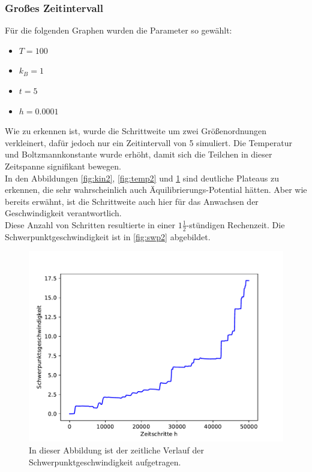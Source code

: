 \subsubsection{Großes Zeitintervall}
Für die folgenden Graphen wurden die Parameter so gewählt:
\begin{itemize}
    \item $T = 100$
    \item $k_B = 1$
    \item $t = 5$
    \item $h = 0.0001$
\end{itemize}
Wie zu erkennen ist, wurde die Schrittweite um zwei Größenordnungen verkleinert, dafür jedoch nur ein Zeitintervall von 5 simuliert.
Die Temperatur und Boltzmannkonstante wurde erhöht, damit sich die Teilchen in dieser Zeitspanne signifikant bewegen.\\
In den Abbildungen \ref{fig:kin2}, \ref{fig:temp2} und \ref{fig:swp2} sind deutliche Plateaus zu erkennen, die sehr wahrscheinlich auch Äquilibrierungs-Potential hätten.
Aber wie bereits erwähnt, ist die Schrittweite auch hier für das Anwachsen der Geschwindigkeit verantwortlich.\\
Diese Anzahl von Schritten resultierte in einer $1\frac{1}{2}$-stündigen Rechenzeit.
\newpage
Die Schwerpunktgeschwindigkeit ist in \autoref{fig:swp2} abgebildet.
\begin{figure}[H]
    \centering
    \includegraphics[scale=0.5]{MolDyn/Big Boy/swp_velocity.pdf}
    \caption{In dieser Abbildung ist der zeitliche Verlauf der Schwerpunktgeschwindigkeit aufgetragen.}
    \label{fig:swp2}
\end{figure}
